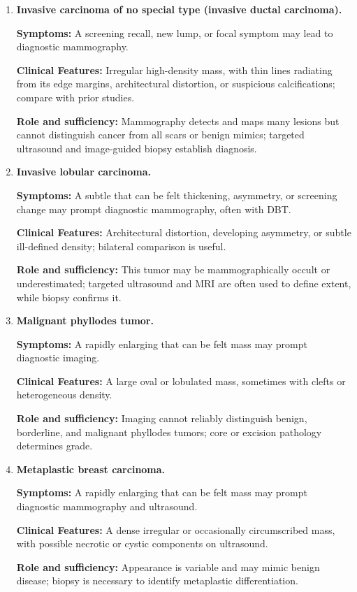 \begin{enumerate}[leftmargin=*,itemsep=0.45em,topsep=0.4em]
\item \textbf{Invasive carcinoma of no special type (invasive ductal carcinoma).}\par\noindent\textbf{Symptoms:} A screening recall, new lump, or focal symptom may lead to diagnostic mammography.\par\noindent\textbf{Clinical Features:} Irregular high-density mass, with thin lines radiating from its edge margins, architectural distortion, or suspicious calcifications; compare with prior studies.\par\noindent\textbf{Role and sufficiency:} Mammography detects and maps many lesions but cannot distinguish cancer from all scars or benign mimics; targeted ultrasound and image-guided biopsy establish diagnosis.
\item \textbf{Invasive lobular carcinoma.}\par\noindent\textbf{Symptoms:} A subtle that can be felt thickening, asymmetry, or screening change may prompt diagnostic mammography, often with DBT.\par\noindent\textbf{Clinical Features:} Architectural distortion, developing asymmetry, or subtle ill-defined density; bilateral comparison is useful.\par\noindent\textbf{Role and sufficiency:} This tumor may be mammographically occult or underestimated; targeted ultrasound and MRI are often used to define extent, while biopsy confirms it.
\item \textbf{Malignant phyllodes tumor.}\par\noindent\textbf{Symptoms:} A rapidly enlarging that can be felt mass may prompt diagnostic imaging.\par\noindent\textbf{Clinical Features:} A large oval or lobulated mass, sometimes with clefts or heterogeneous density.\par\noindent\textbf{Role and sufficiency:} Imaging cannot reliably distinguish benign, borderline, and malignant phyllodes tumors; core or excision pathology determines grade.
\item \textbf{Metaplastic breast carcinoma.}\par\noindent\textbf{Symptoms:} A rapidly enlarging that can be felt mass may prompt diagnostic mammography and ultrasound.\par\noindent\textbf{Clinical Features:} A dense irregular or occasionally circumscribed mass, with possible necrotic or cystic components on ultrasound.\par\noindent\textbf{Role and sufficiency:} Appearance is variable and may mimic benign disease; biopsy is necessary to identify metaplastic differentiation.

\end{enumerate}
